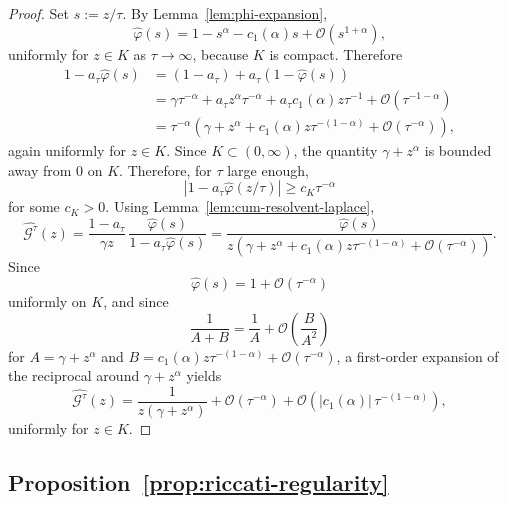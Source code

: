 \documentclass[letterpaper]{article}
\numberwithin{equation}{section}
\theoremstyle{definition}
\theoremstyle{remark}
\begin{document}
\begin{proof}
Set $s:=z/\tau$. By Lemma~\ref{lem:phi-expansion},
\[
  \hat\varphi(s)
  =
  1-s^\alpha-c_1(\alpha)s+\mathcal O(s^{1+\alpha}),
\]
uniformly for $z\in K$ as $\tau\to\infty$, because $K$ is compact. Therefore
\begin{align*}
  1-a_\tau\hat\varphi(s)
  &=
  (1-a_\tau)+a_\tau(1-\hat\varphi(s))
  \\
  &=
  \gamma\tau^{-\alpha}
  +a_\tau z^\alpha\tau^{-\alpha}
  +a_\tau c_1(\alpha)z\tau^{-1}
  +\mathcal O(\tau^{-1-\alpha})
  \\
  &=
  \tau^{-\alpha}
  \left(
    \gamma+z^\alpha+c_1(\alpha)z\tau^{-(1-\alpha)}
    +\mathcal O(\tau^{-\alpha})
  \right),
\end{align*}
again uniformly for $z\in K$. Since $K\subset(0,\infty)$, the quantity
$\gamma+z^\alpha$ is bounded away from $0$ on $K$. Therefore, for $\tau$ large
enough,
\[
  \left|1-a_\tau\hat\varphi(z/\tau)\right|
  \ge c_K\tau^{-\alpha}
\]
for some $c_K>0$.
Using Lemma~\ref{lem:cum-resolvent-laplace},
\[
  \widehat{\mathcal G^\tau}(z)
  =
  \frac{1-a_\tau}{\gamma z}\,
  \frac{\hat\varphi(s)}{1-a_\tau\hat\varphi(s)}
  =
  \frac{\hat\varphi(s)}
       {z\left(
         \gamma+z^\alpha+c_1(\alpha)z\tau^{-(1-\alpha)}
         +\mathcal O(\tau^{-\alpha})
       \right)}.
\]
Since
\[
  \hat\varphi(s)=1+\mathcal O(\tau^{-\alpha})
\]
uniformly on $K$, and since
\[
  \frac{1}{A+B}
  =
  \frac{1}{A}+\mathcal O\!\left(\frac{B}{A^2}\right)
\]
for $A=\gamma+z^\alpha$ and
$B=c_1(\alpha)z\tau^{-(1-\alpha)}+\mathcal O(\tau^{-\alpha})$,
a first-order expansion of the reciprocal around $\gamma+z^\alpha$ yields
\[
  \widehat{\mathcal G^\tau}(z)
  =
  \frac{1}{z(\gamma+z^\alpha)}
  +
  \mathcal O(\tau^{-\alpha})
  +
  \mathcal O\!\left(|c_1(\alpha)|\,\tau^{-(1-\alpha)}\right),
\]
uniformly for $z\in K$.
\end{proof}


\subsection{Proposition~\ref{prop:riccati-regularity}}\label{app:riccati-regularity}
\end{document}
